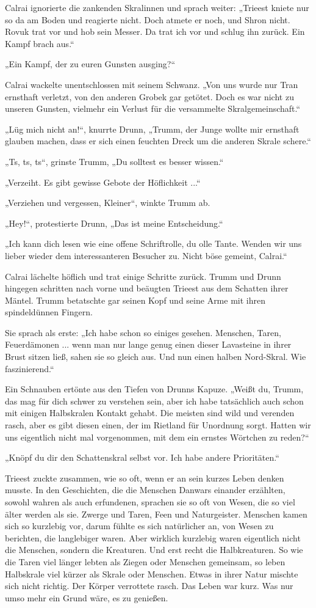 Calrai ignorierte die zankenden Skralinnen und sprach weiter: „Trieest kniete nur so da am Boden und reagierte nicht. Doch atmete er noch, und Shron nicht. Rovuk trat vor und hob sein Messer. Da trat ich vor und schlug ihn zurück. Ein Kampf brach aus.“

„Ein Kampf, der zu euren Gunsten ausging?“

Calrai wackelte unentschlossen mit seinem Schwanz. „Von uns wurde nur Tran ernsthaft verletzt, von den anderen Grobek gar getötet. Doch es war nicht zu unseren Gunsten, vielmehr ein Verlust für die versammelte Skralgemeinschaft.“

„Lüg mich nicht an!“, knurrte Drunn, „Trumm, der Junge wollte mir ernsthaft glauben machen, dass er sich einen feuchten Dreck um die anderen Skrale schere.“

„Ts, ts, ts“, grinste Trumm, „Du solltest es besser wissen.“

„Verzeiht. Es gibt gewisse Gebote der Höflichkeit ...“

„Verziehen und vergessen, Kleiner“, winkte Trumm ab.

„Hey!“, protestierte Drunn, „Das ist meine Entscheidung.“

„Ich kann dich lesen wie eine offene Schriftrolle, du olle Tante. Wenden wir uns lieber wieder dem interessanteren Besucher zu. Nicht böse gemeint, Calrai.“

Calrai lächelte höflich und trat einige Schritte zurück. Trumm und Drunn hingegen schritten nach vorne und beäugten Trieest aus dem Schatten ihrer Mäntel. Trumm betatschte gar seinen Kopf und seine Arme mit ihren spindeldünnen Fingern.

Sie sprach als erste: „Ich habe schon so einiges gesehen. Menschen, Taren, Feuerdämonen ... wenn man nur lange genug einen dieser Lavasteine in ihrer Brust sitzen ließ, sahen sie so gleich aus. Und nun einen halben Nord-Skral. Wie faszinierend.“

Ein Schnauben ertönte aus den Tiefen von Drunns Kapuze. „Weißt du, Trumm, das mag für dich schwer zu verstehen sein, aber ich habe tatsächlich auch schon mit einigen Halbskralen Kontakt gehabt. Die meisten sind wild und verenden rasch, aber es gibt diesen einen, der im Rietland für Unordnung sorgt. Hatten wir uns eigentlich nicht mal vorgenommen, mit dem ein ernstes Wörtchen zu reden?“

„Knöpf du dir den Schattenskral selbst vor. Ich habe andere Prioritäten.“

Trieest zuckte zusammen, wie so oft, wenn er an sein kurzes Leben denken musste. In den Geschichten, die die Menschen Danwars einander erzählten, sowohl wahren als auch erfundenen, sprachen sie so oft von Wesen, die so viel älter werden als sie. Zwerge und Taren, Feen und Naturgeister. Menschen kamen sich so kurzlebig vor, darum fühlte es sich natürlicher an, von Wesen zu berichten, die langlebiger waren. Aber wirklich kurzlebig waren eigentlich nicht die Menschen, sondern die Kreaturen. Und erst recht die Halbkreaturen. So wie die Taren viel länger lebten als Ziegen oder Menschen gemeinsam, so leben Halbskrale viel kürzer als Skrale oder Menschen. Etwas in ihrer Natur mischte sich nicht richtig. Der Körper verrottete rasch. Das Leben war kurz. Was nur umso mehr ein Grund wäre, es zu genießen.

